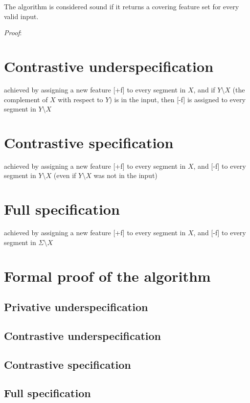 \documentclass[11pt, oneside]{article}   	%
\begin{document}
\vspace{\baselineskip} The algorithm is considered sound if it returns a covering feature set for every valid input. 

\textit{Proof}:


\section{Contrastive underspecification}
achieved by assigning a new feature [+f] to every segment in $X$, and if $Y \setminus X$ (the complement of $X$ with respect to $Y$) is in the input, then [-f] is assigned to every segment in $Y \setminus X$

\section{Contrastive specification}
achieved by assigning a new feature [+f] to every segment in $X$, and [-f] to every segment in $Y \setminus X$ (even if $Y \setminus X$ was not in the input)

\section{Full specification}
achieved by assigning a new feature [+f] to every segment in $X$, and [-f] to every segment in $\Sigma \setminus X$

\appendix

\section{Formal proof of the algorithm}

\subsection{Privative underspecification}

\subsection{Contrastive underspecification}

\subsection{Contrastive specification}

\subsection{Full specification}
\end{document}
